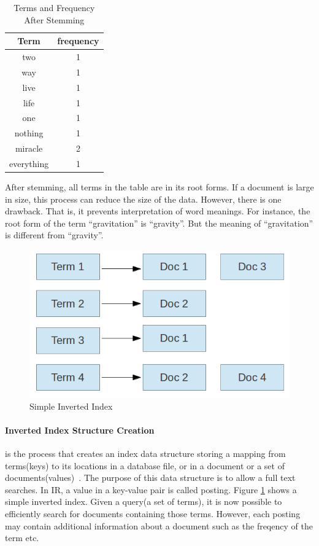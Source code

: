 \begin{table}
\centering
\begin{tabular}{|c|c|}
\hline \textbf{Term} & \textbf{frequency} \\
\hline two & 1 \\
\hline way & 1 \\
\hline live & 1 \\
\hline life & 1 \\
\hline one & 1 \\
\hline nothing & 1 \\
\hline miracle & 2 \\
\hline everything & 1 \\  
\hline
\end{tabular}
\caption{Terms and Frequency After Stemming} \label{table:stemming}
\end{table}
After stemming, all terms in the table are in its root forms. If a document is large in size, this process can reduce the size of the data. However, 
there is one drawback. That is, it prevents interpretation of word meanings. For instance, the root form of the term ``gravitation'' is ``gravity''. But
the meaning of ``gravitation'' is different from ``gravity''.

\begin{figure}
\centering
\includegraphics[scale=0.5]{./figures/invertedIndex.png}
\caption{Simple Inverted Index} \label{fig:invertedIndex} 
\end{figure}

\paragraph{Inverted Index Structure Creation} is the process that creates an index data structure storing a mapping from terms(keys) to its 
locations in a database file, or in a document or a set of documents(values)~\cite{invertedindex}. 
The purpose of this data structure is to allow a full text searches. In IR, a value in a key-value pair is called posting. 
Figure \ref{fig:invertedIndex} shows a simple inverted index. Given a query(a set of terms), it is now possible to efficiently search for
documents containing those terms. However, each posting may contain additional information about a document such as the freqency of the term etc.

